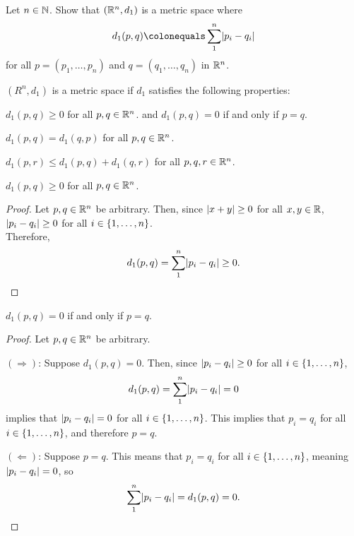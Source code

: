 \begin{problem}
  Let $n \in \mathbb{N}$. Show that $(\mathbb{R}^n, d_1)$ is a metric space
  where \[ d_1(p, q) \colonequals \sum_1^n \abs{p_i - q_i} \]
  for all $p = (p_1, \dots, p_n)$ and $q = (q_1, \dots, q_n)$ in $\mathbb{R}^n$.
\end{problem}
\begin{answer}
  $(R^n, d_1)$ is a metric space if $d_1$ satisfies the following properties:
  \begin{enumarabic}
    \item $d_1(p, q) \geq 0$ for all $p, q \in \mathbb{R}^n$.
      and $d_1(p, q) = 0$ if and only if $p = q$.
    \item $d_1(p, q) = d_1(q, p)$ for all $p, q \in \mathbb{R}^n$.
    \item $d_1(p, r) \leq d_1(p, q) + d_1(q, r)$ for all $p, q, r \in \mathbb{R}^n$.
  \end{enumarabic}

  \begin{claim}
    $d_1(p, q) \geq 0$ for all $p, q \in \mathbb{R}^n$.

    \begin{proof}
      Let $p, q \in \mathbb{R}^n$ be arbitrary.
      Then, since $\lvert x + y\rvert \geq 0$ for all $x, y \in \mathbb{R}$,
      $\lvert p_i - q_i\rvert \geq 0$ for all $i \in \left\{1, \dots, n\right\}$. \\
      Therefore,
      \[ d_1(p, q) = \sum_1^n \lvert p_i - q_i\rvert \geq 0. \]
    \end{proof}
  \end{claim}

  \begin{claim}
    $d_1(p, q) = 0$ if and only if $p = q$.

    \begin{proof}
      Let $p, q \in \mathbb{R}^n$ be arbitrary.

      \step $(\Longrightarrow)$:
        Suppose $d_1(p, q) = 0$.
        Then, since $\lvert p_i - q_i\rvert \geq 0$ for all $i \in \left\{1, \dots, n\right\}$,
        \[ d_1(p, q) = \sum_1^n \lvert p_i - q_i\rvert = 0 \]
        implies that $\lvert p_i - q_i\rvert = 0$ for all $i \in \left\{1, \dots, n\right\}$.
        This implies that $p_i = q_i$ for all $i \in \left\{1, \dots, n\right\}$,
        and therefore $p = q$.

      \step $(\Longleftarrow)$:
        Suppose $p = q$.
        This means that $p_i = q_i$ for all $i \in \left\{1, \dots, n\right\}$,
        meaning $\lvert p_i - q_i\rvert = 0$, so
        \[ \sum_1^n \lvert p_i - q_i\rvert = d_1(p, q) = 0. \]
    \end{proof}
  \end{claim}


\end{answer}
